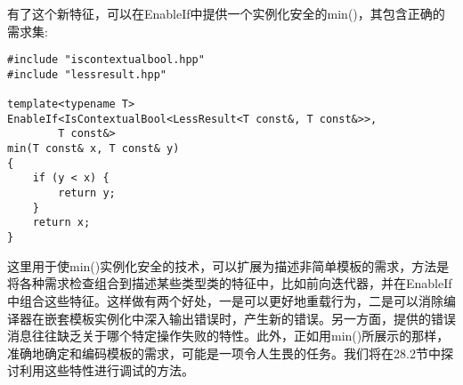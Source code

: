 有了这个新特征，可以在EnableIf中提供一个实例化安全的min()，其包含正确的需求集:

\begin{lstlisting}[style=styleCXX]
#include "iscontextualbool.hpp"
#include "lessresult.hpp"

template<typename T>
EnableIf<IsContextualBool<LessResult<T const&, T const&>>,
		T const&>
min(T const& x, T const& y)
{
	if (y < x) {
		return y;
	}
	return x;
}
\end{lstlisting}

这里用于使min()实例化安全的技术，可以扩展为描述非简单模板的需求，方法是将各种需求检查组合到描述某些类型类的特征中，比如前向迭代器，并在EnableIf中组合这些特征。这样做有两个好处，一是可以更好地重载行为，二是可以消除编译器在嵌套模板实例化中深入输出错误时，产生新的错误。另一方面，提供的错误消息往往缺乏关于哪个特定操作失败的特性。此外，正如用min()所展示的那样，准确地确定和编码模板的需求，可能是一项令人生畏的任务。我们将在28.2节中探讨利用这些特性进行调试的方法。





